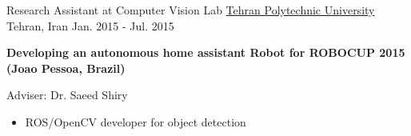 \begin{cventries}
  \cventry
    {Research Assistant at Computer Vision Lab} %
    {\href{http://aut.ac.ir/aut/}{Tehran Polytechnic University}} %
    {Tehran, Iran} %
    {Jan. 2015 - Jul. 2015} %
    {
      \begin{cvitems} %
        \item \textbf{Developing an autonomous home assistant  Robot for ROBOCUP 2015 (Joao Pessoa, Brazil)} \begin{flushright} {\color{awesome} Adviser: Dr. Saeed Shiry} \end{flushright}
        \begin{itemize}
        \item ROS/OpenCV developer for object detection
        \end{itemize}
      \end{cvitems}
    }



\end{cventries}
